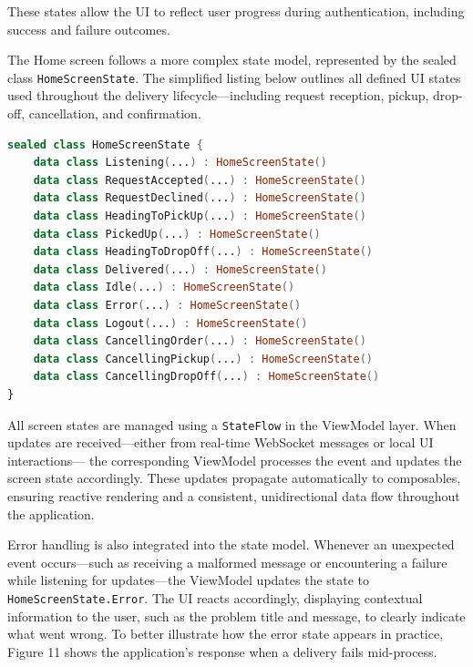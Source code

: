 These states allow the UI to reflect user progress during authentication, including success and failure outcomes.

The Home screen follows a more complex state model, represented by the sealed class \texttt{HomeScreenState}. The simplified listing below outlines all defined UI states used throughout the delivery lifecycle—including request reception, pickup, drop-off, cancellation, and confirmation.

\begin{lstlisting}[language=Kotlin, caption={Simplified HomeScreenState sealed class}]
sealed class HomeScreenState {
    data class Listening(...) : HomeScreenState()
    data class RequestAccepted(...) : HomeScreenState()
    data class RequestDeclined(...) : HomeScreenState()
    data class HeadingToPickUp(...) : HomeScreenState()
    data class PickedUp(...) : HomeScreenState()
    data class HeadingToDropOff(...) : HomeScreenState()
    data class Delivered(...) : HomeScreenState()
    data class Idle(...) : HomeScreenState()
    data class Error(...) : HomeScreenState()
    data class Logout(...) : HomeScreenState()
    data class CancellingOrder(...) : HomeScreenState()
    data class CancellingPickup(...) : HomeScreenState()
    data class CancellingDropOff(...) : HomeScreenState()
}
\end{lstlisting}

All screen states are managed using a \texttt{StateFlow} in the ViewModel layer. When updates are received—either from real-time WebSocket messages or local UI interactions— the corresponding ViewModel processes the event and updates the screen state accordingly. These updates propagate automatically to composables, ensuring reactive rendering and a consistent, unidirectional data flow throughout the application.

Error handling is also integrated into the state model. Whenever an unexpected event occurs—such as receiving a malformed message or encountering a failure while listening for updates—the ViewModel updates the state to \texttt{HomeScreenState.Error}. The UI reacts accordingly, displaying contextual information to the user, such as the problem title and message, to clearly indicate what went wrong.
To better illustrate how the error state appears in practice, Figure 11 shows the application’s response when a delivery fails mid-process.

